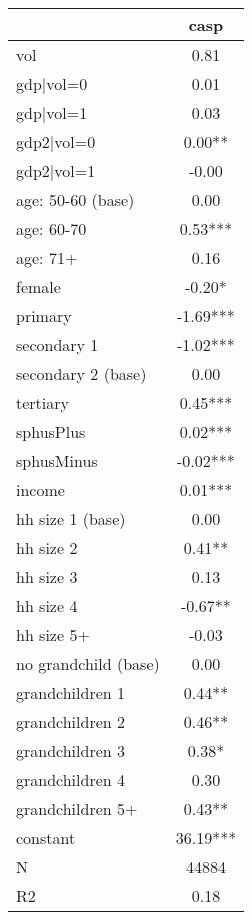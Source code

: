 {
\def\sym#1{\ifmmode^{#1}\else\(^{#1}\)\fi}
\begin{tabular}{l*{1}{c}}
\hline\hline
            &\multicolumn{1}{c}{casp}\\
\hline
vol         &        0.81   \\
gdp|vol=0   &        0.01   \\
gdp|vol=1   &        0.03   \\
gdp2|vol=0  &        0.00** \\
gdp2|vol=1  &       -0.00   \\
age: 50-60 (base)&        0.00   \\
age: 60-70  &        0.53***\\
age: 71+    &        0.16   \\
female      &       -0.20*  \\
primary     &       -1.69***\\
secondary 1 &       -1.02***\\
secondary 2 (base)&        0.00   \\
tertiary    &        0.45***\\
sphusPlus   &        0.02***\\
sphusMinus  &       -0.02***\\
income      &        0.01***\\
hh size 1 (base)&        0.00   \\
hh size 2   &        0.41** \\
hh size 3   &        0.13   \\
hh size 4   &       -0.67** \\
hh size 5+  &       -0.03   \\
no grandchild (base)&        0.00   \\
grandchildren 1&        0.44** \\
grandchildren 2&        0.46** \\
grandchildren 3&        0.38*  \\
grandchildren 4&        0.30   \\
grandchildren 5+&        0.43** \\
constant    &       36.19***\\
\hline
N           &       44884   \\
R2          &        0.18   \\
\hline\hline
\end{tabular}
}
